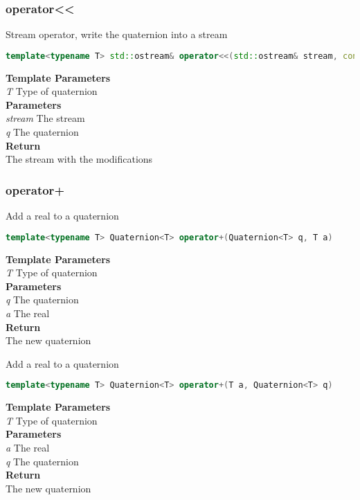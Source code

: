\subsubsection{operator<<}
\begin{mdframed}
Stream operator, write the quaternion into a stream
\begin{lstlisting}[language=C++]
template<typename T> std::ostream& operator<<(std::ostream& stream, const Quaternion<T>& q) 
\end{lstlisting}
\textbf{Template Parameters} \\ 
\textit{T} Type of quaternion \\ 
\textbf{Parameters} \\ 
\textit{stream} The stream \\ 
\textit{q} The quaternion \\ 
\textbf{Return} \\ 
The stream with the modifications\\ 
\end{mdframed}

\subsubsection{operator+}
\begin{mdframed}
Add a real to a quaternion
\begin{lstlisting}[language=C++]
template<typename T> Quaternion<T> operator+(Quaternion<T> q, T a) 
\end{lstlisting}
\textbf{Template Parameters} \\ 
\textit{T} Type of quaternion \\ 
\textbf{Parameters} \\ 
\textit{q} The quaternion \\ 
\textit{a} The real \\ 
\textbf{Return} \\ 
The new quaternion\\ 
\end{mdframed}

\begin{mdframed}
Add a real to a quaternion
\begin{lstlisting}[language=C++]
template<typename T> Quaternion<T> operator+(T a, Quaternion<T> q) 
\end{lstlisting}
\textbf{Template Parameters} \\ 
\textit{T} Type of quaternion \\ 
\textbf{Parameters} \\ 
\textit{a} The real \\ 
\textit{q} The quaternion \\ 
\textbf{Return} \\ 
The new quaternion\\ 
\end{mdframed}

